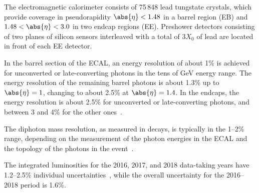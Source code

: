 





The electromagnetic calorimeter consists of 75\,848 lead tungstate crystals, which provide coverage in pseudorapidity $\abs{\eta} < 1.48 $ in a barrel region (EB) 
and $1.48 < \abs{\eta} < 3.0$ in two endcap regions (EE). Preshower detectors consisting of two planes of silicon sensors interleaved with a total of $3 X_0$ of 
lead are located in front of each EE detector.

In the barrel section of the ECAL, an energy resolution of about 1\% is achieved for unconverted or late-converting photons in the tens of GeV energy range. 
The energy resolution of the remaining barrel photons is about 1.3\% up to $\abs{\eta} = 1$, changing to about 2.5\% at $\abs{\eta} = 1.4$. In the endcaps, 
the energy resolution is about 2.5\% for unconverted or late-converting photons, and between 3 and 4\% for the other ones~\cite{CMS:2015myp}.

The diphoton mass resolution, as measured in \Htogg decays, is typically in the 1--2\% range, depending on the measurement of the photon 
energies in the ECAL and the topology of the photons in the event~\cite{CMS:2020xrn}.

The integrated luminosities for the 2016, 2017, and 2018 data-taking years have 1.2--2.5\% individual uncertainties~\cite{CMS-LUM-17-003,CMS-PAS-LUM-17-004,CMS-PAS-LUM-18-002}, 
while the overall uncertainty for the 2016--2018 period is 1.6\%.